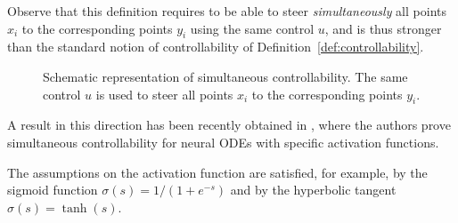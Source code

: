 Observe that this definition requires to be able to steer \emph{simultaneously} all points $x_i$ to the corresponding points $y_i$ using the same control $u$, and is thus stronger than the standard notion of controllability of Definition~\ref{def:controllability}.

\begin{figure}
    \centering
    \begin{tikzpicture}[>=latex, thick, 
    x={(0.8cm,-0.3cm)}, y={(0cm,1cm)}, z={(0.2cm,0.6cm)}]
        
    \end{tikzpicture}
    \caption{Schematic representation of simultaneous controllability. The same control $u$ is used to steer all points $x_i$ to the corresponding points $y_i$.}
\end{figure}

A result in this direction has been recently obtained in \cite{tabuadaUniversal2023}, where the authors prove simultaneous controllability for neural ODEs with specific activation functions.


The assumptions on the activation function are satisfied, for example, by the sigmoid function $\sigma(s) = 1/(1+e^{-s})$ and by the hyperbolic tangent $\sigma(s) = \tanh(s)$.


